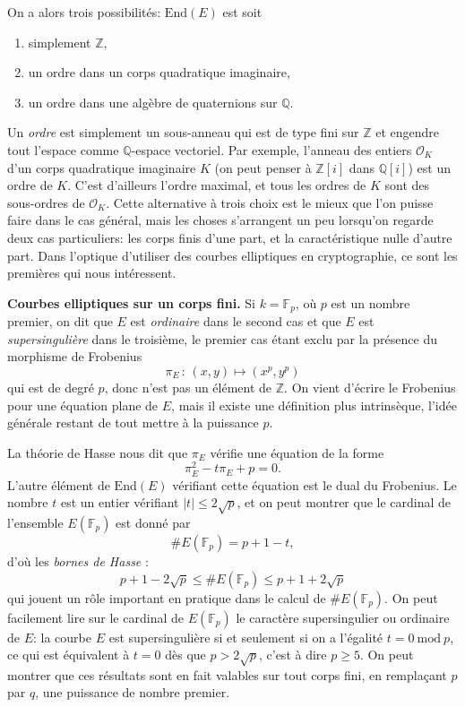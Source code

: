 \documentclass[11pt,a4paper]{article}
\newcommand{\Z}{\mathbb{Z}}
\newcommand{\F}{\mathbb{F}}
\newcommand{\Q}{\mathbb{Q}}
\renewcommand{\O}{\mathcal{O}}
\newcommand{\End}{\mathrm{End}}
\newcommand{\de}{\,:\,}
\renewcommand{\mod}{\ \mathrm{mod}\ }
\renewcommand{\v}{\vspace{5mm}}
\theoremstyle{definition}
\begin{document}
On a alors trois possibilités: $\End(E)$ est soit
\begin{enumerate} 
\item simplement $\Z$, 
\item un ordre dans un corps quadratique imaginaire,
\item un ordre dans une algèbre de quaternions sur $\Q$. 
\end{enumerate}
Un \emph{ordre} est simplement un sous-anneau qui est de type fini sur $\Z$ et engendre tout l'espace comme $\Q$-espace vectoriel. Par exemple, l'anneau des entiers $\O_K$ d'un corps quadratique imaginaire $K$ (on peut penser à $\Z[i]$ dans $\Q[i]$) est un ordre de $K$. C'est d'ailleurs l'ordre maximal, et tous les ordres de $K$ sont des sous-ordres de $\O_K$. Cette alternative à trois choix est le mieux que l'on puisse faire dans le cas général, mais les choses s'arrangent un peu lorsqu'on regarde deux cas particuliers: les corps finis d'une part, et la caractéristique nulle d'autre part. Dans l'optique d'utiliser des courbes elliptiques en cryptographie, ce sont les premières qui nous intéressent.

\v

\textbf{Courbes elliptiques sur un corps fini.} Si $k = \F_p$, où $p$ est un nombre premier, on dit que $E$ est \emph{ordinaire} dans le second cas et que $E$ est \emph{supersingulière} dans le troisième, le premier cas étant exclu par la présence du morphisme de Frobenius
$$\pi_E\de (x,y)\mapsto (x^p, y^p)$$
qui est de degré $p$, donc n'est pas un élément de $\Z$. On vient d'écrire le Frobenius pour une équation plane de $E$, mais il existe une définition plus intrinsèque, l'idée générale restant de tout mettre à la puissance $p$.

La théorie de Hasse nous dit que $\pi_E$ vérifie une équation de la forme
$$\pi_E^2 - t \pi_E + p = 0.$$
L'autre élément de $\End(E)$ vérifiant cette équation est le dual du Frobenius.
Le nombre $t$ est un entier vérifiant $|t|\leq 2\sqrt{p}$, et on peut montrer que le cardinal de l'ensemble $E(\F_p)$ est donné par
$$\# E(\F_p) = p + 1 - t,$$
d'où les \emph{bornes de Hasse} :
$$p + 1 - 2\sqrt{p} \leq \#E(\F_p) \leq p + 1 + 2\sqrt{p}$$
qui jouent un rôle important en pratique dans le calcul de $\# E(\F_p)$. On peut facilement lire sur le cardinal de $E(\F_p)$ le caractère supersingulier ou ordinaire de $E$: la courbe $E$ est supersingulière si et seulement si on a l'égalité $t = 0 \mod p$, ce qui est équivalent à $t=0$ dès que $p > 2\sqrt{p}$, c'est à dire $p \geq 5$. On peut montrer que ces résultats sont en fait valables sur tout corps fini, en remplaçant $p$ par $q$, une puissance de nombre premier.
\end{document}
